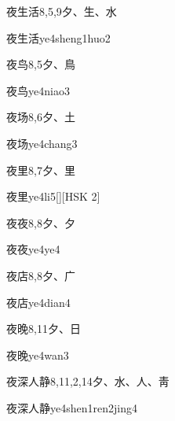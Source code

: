 \begin{entry}{夜生活}{8,5,9}{⼣、⽣、⽔}
  \begin{phonetics}{夜生活}{ye4sheng1huo2}
  \end{phonetics}
\end{entry}

\begin{entry}{夜鸟}{8,5}{⼣、⿃}
  \begin{phonetics}{夜鸟}{ye4niao3}
  \end{phonetics}
\end{entry}

\begin{entry}{夜场}{8,6}{⼣、⼟}
  \begin{phonetics}{夜场}{ye4chang3}
  \end{phonetics}
\end{entry}

\begin{entry}{夜里}{8,7}{⼣、⾥}
  \begin{phonetics}{夜里}{ye4li5}[][HSK 2]
  \end{phonetics}
\end{entry}

\begin{entry}{夜夜}{8,8}{⼣、⼣}
  \begin{phonetics}{夜夜}{ye4ye4}
  \end{phonetics}
\end{entry}

\begin{entry}{夜店}{8,8}{⼣、⼴}
  \begin{phonetics}{夜店}{ye4dian4}
  \end{phonetics}
\end{entry}

\begin{entry}{夜晚}{8,11}{⼣、⽇}
  \begin{phonetics}{夜晚}{ye4wan3}
  \end{phonetics}
\end{entry}

\begin{entry}{夜深人静}{8,11,2,14}{⼣、⽔、⼈、⾭}
  \begin{phonetics}{夜深人静}{ye4shen1ren2jing4}
  \end{phonetics}
\end{entry}

